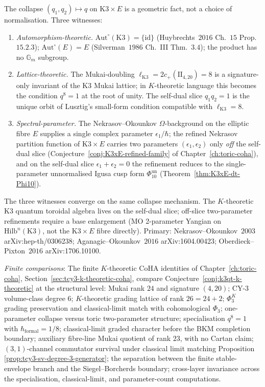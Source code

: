 \begin{remark}
\label{rem:k3qt-collapse-geometric}
The collapse $(q_1, q_2) \mapsto q$ on $\mathrm{K3}\times E$ is a
geometric fact, not a choice of normalisation. Three witnesses:
\begin{enumerate}[label=\textup{(\roman*)}]
\item \emph{Automorphism-theoretic.} $\mathrm{Aut}^\circ(\mathrm{K3})
= \{\mathrm{id}\}$ (Huybrechts~$2016$ Ch.~$15$ Prop.~$15.2.3$);
$\mathrm{Aut}^\circ(E) = E$ (Silverman~$1986$ Ch.~III Thm.~$3.4$);
the product has no $\mathbb G_m$ subgroup.
\item \emph{Lattice-theoretic.} The Mukai-doubling
$\ell_{\mathrm{K3}} = 2 c_+(\mathrm{II}_{4, 20}) = 8$ is a
signature-only invariant of the K3 Mukai lattice; in $K$-theoretic
language this becomes the condition $q^8 = 1$ at the root of unity.
The self-dual slice $q_1 q_2 = 1$ is the unique orbit of Lusztig's
small-form condition compatible with $\ell_{\mathrm{K3}} = 8$.
\item \emph{Spectral-parameter.} The Nekrasov--Okounkov
$\Omega$-background on the elliptic fibre $E$ supplies a single
complex parameter $\epsilon_1/\hbar$; the refined Nekrasov partition
function of $\mathrm{K3}\times E$ carries two parameters
$(\epsilon_1, \epsilon_2)$ only \emph{off} the self-dual slice
(Conjecture~\ref{conj:K3xE-refined-family} of
Chapter~\ref{ch:toric-coha}), and on the self-dual slice
$\epsilon_1 + \epsilon_2 = 0$ the refinement reduces to the
single-parameter unnormalised Igusa cusp form \(\Phi_{10}^{\mathrm{un}}\)
(Theorem~\ref{thm:K3xE-dt-Phi10}).
\end{enumerate}
The three witnesses converge on the same collapse mechanism. The
$K$-theoretic K3 quantum toroidal algebra lives on the self-dual
slice; off-slice two-parameter refinements require
a base enlargement (MO 2-parameter Yangian on
$\mathrm{Hilb}^n(\mathrm K3)$, not the $\mathrm{K3}\times E$ fibre
directly). Primary: Nekrasov--Okounkov~$2003$ arXiv:hep-th/0306238;
Aganagic--Okounkov~$2016$ arXiv:1604.00423; Oberdieck--Pixton~$2016$
arXiv:1706.10100.
\end{remark}

\noindent\textit{Finite comparisons}:
The finite \(K\)-theoretic CoHA identities of
Chapter~\ref{ch:toric-coha}, Section~\ref{sec:tcy3-k-theoretic-coha},
compare
Conjecture~\ref{conj:k3qt-k-theoretic} at the structural level:
Mukai rank $24$ and signature $(4, 20)$; CY-$3$ volume-class degree
$6$; $K$-theoretic grading lattice of rank $26 = 24 + 2$; $\Phi_3^K$
grading preservation and classical-limit match with cohomological
$\Phi_3$; one-parameter collapse versus toric two-parameter structure;
specialisation $q^8 = 1$ with $\hbar_{\mathrm{formal}} = 1/8$;
classical-limit graded character before the BKM completion boundary;
auxiliary fibre-line Mukai quotient of rank \(23\), with no Cartan claim; $(3, 1)$-channel
commutator survival under classical limit matching Proposition
\textup{\ref{prop:tcy3-sv-degree-3-generator}};
the separation between the finite stable-envelope branch and the
Siegel--Borcherds boundary; cross-layer invariance across the
specialisation, classical-limit, and parameter-count computations.

